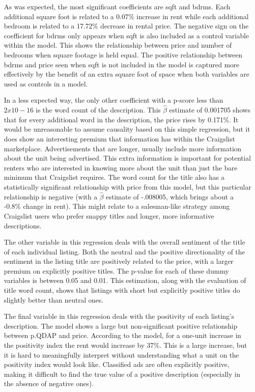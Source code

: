 \documentclass[12pt,english]{article}
\begin{document}
As was expected, the most significant coefficients are sqft and bdrms. Each additional square foot is related to a 0.07\% increase in rent while each additional bedroom is related to a 17.72\% decrease in rental price. The negative sign on the coefficient for bdrms only appears when sqft is also included as a control variable within the model. This shows the relationship between price and number of bedrooms when square footage is held equal. The positive relationship between bdrms and price seen when sqft is not included in the model is captured more effectively by the benefit of an extra square foot of space when both variables are used as controls in a model. 

In a less expected way, the only other coefficient with a p-score less than $2x10-16$ is the word count of the description. This $\hat{\beta}$ estimate of 0.001705 shows that for every additional word in the description, the price rises by 0.171\%. It would be unreasonable to assume causality based on this simple regression, but it does show an interesting premium that information has within the Craigslist marketplace. Advertisements that are longer, usually include more information about the unit being advertised. This extra information is important for potential renters who are interested in knowing more about the unit than just the bare minimum that Craigslist requires. The word count for the title also has a statistically significant relationship with price from this model, but this particular relationship is negative (with a $\hat{\beta}$ estimate of -.008005, which brings about a -0.8\% change in rent). This might relate to a salesman-like strategy among Craigslist users who prefer snappy titles and longer, more informative descriptions. 

The other variable in this regression deals with the overall sentiment of the title of each individual listing. Both the neutral and the positive directionality of the sentiment in the listing title are positively related to the price, with a larger premium on explicitly positive titles. The p-value for each of these dummy variables is between 0.05 and 0.01. This estimation, along with the evaluation of title word count, shows that listings with short but explicitly positive titles do slightly better than neutral ones. 

The final variable in this regression deals with the positivity of each listing’s description. The model shows a large but non-significant positive relationship between p.QDAP and price. According to the model, for a one-unit increase in the positivity index the rent would increase by 37\%. This is a large increase, but it is hard to meaningfully interpret without understanding what a unit on the positivity index would look like. Classified ads are often explicitly positive, making it difficult to find the true value of a positive description (especially in the absence of negative ones). 
\end{document}
